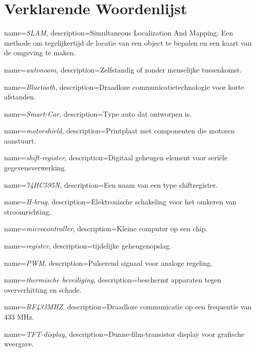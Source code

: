 \section{Verklarende Woordenlijst}
\printglossaries


{
    name=\textit{SLAM},
    description={Simultaneous Localization And Mapping: Een methode om tegelijkertijd de locatie van een object te bepalen en een kaart van de omgeving te maken.}
}

{
    name=\textit{autonoom},
    description={Zelfstandig of zonder menselijke tussenkomst.}
}

{
    name=\textit{Bluetooth},
    description={Draadloze communicatietechnologie voor korte afstanden.}
}

{
    name=\textit{Smart-Car},
    description={Type auto dat ontworpen is.}
}

{
    name=\textit{motorshield},
    description={Printplaat met componenten die motoren aanstuurt.}
}

{
    name=\textit{shift-register},
    description={Digitaal geheugen element voor seriële gegevensverwerking.}
}

{
    name=\textit{74HC595N},
    description={Een naam van een type shiftregister.}
}

{
    name=\textit{H-brug},
    description={Elektronische schakeling voor het omkeren van stroomrichting.}
}

{
    name=\textit{microcontroller},
    description={Kleine computer op een chip.}
}

{
    name=\textit{register},
    description={tijdelijke geheugenopslag.}
}

{
    name=\textit{PWM},
    description={Pulserend signaal voor analoge regeling.}
}

{
    name=\textit{thermische beveiliging},
    description={beschermt apparaten tegen oververhitting en schade.}
}

{
    name=\textit{RF433MHZ},
    description={Draadloze communicatie op een frequentie van 433 MHz.}
}

{
    name=\textit{TFT-display},
    description={Dunne-film-transistor display voor grafische weergave.}
}

